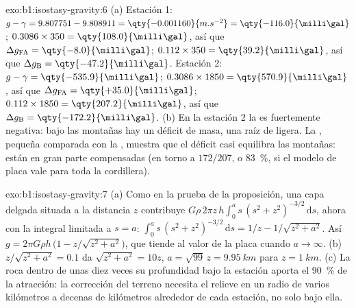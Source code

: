 \begin{solution}{exo:b1:isostasy-gravity:6}
(a) Estación 1: $g - \gamma = 9.807751 - 9.808911 = \qty{-0.001160}{m.s^{-2}} =
\qty{-116.0}{\milli\gal}$;  $0.3086\times350 =
\qty{108.0}{\milli\gal}$, así que $\Delta g_{\mathrm{FA}} = \qty{-8.0}{\milli\gal}$;
 $0.112\times350 = \qty{39.2}{\milli\gal}$, así que
$\Delta g_{\mathrm B} = \qty{-47.2}{\milli\gal}$.
Estación 2: $g - \gamma = \qty{-535.9}{\milli\gal}$; 
$0.3086\times1850 = \qty{570.9}{\milli\gal}$, así que $\Delta g_{\mathrm{FA}} =
\qty{+35.0}{\milli\gal}$;  $0.112\times1850 =
\qty{207.2}{\milli\gal}$, así que $\Delta g_{\mathrm B} = \qty{-172.2}{\milli\gal}$.
(b) En la estación 2 la  es fuertemente negativa: bajo las montañas
hay un déficit de masa, una raíz de  ligera. La , pequeña
comparada con la , muestra que el déficit casi equilibra las montañas:
están en gran parte compensadas (en torno a $172/207$, o \qty{83}{\percent}, si el modelo de
placa vale para toda la cordillera).
\end{solution}

\begin{solution}{exo:b1:isostasy-gravity:7}
(a) Como en la prueba de la proposición, una capa delgada situada a la distancia $z$
contribuye $G\rho\,2\pi z\,h\int_0^a s\,(s^2 + z^2)^{-3/2}\,\mathrm ds$, ahora
con la integral limitada a $s = a$:
$\int_0^a s\,(s^2 + z^2)^{-3/2}\,\mathrm ds = 1/z - 1/\sqrt{z^2 + a^2}$. Así
$g = 2\pi G\rho h\,\bigl(1 - z/\sqrt{z^2 + a^2}\bigr)$, que tiende al valor de la placa
cuando $a \to \infty$. (b) $z/\sqrt{z^2 + a^2} = 0.1$ da
$\sqrt{z^2 + a^2} = 10z$, $a = \sqrt{99}\,z = \qty{9.95}{km}$ para
$z = \qty{1}{km}$. (c) La roca dentro de unas diez veces su profundidad bajo la
estación aporta el \qty{90}{\percent} de la atracción: la corrección del terreno
necesita el relieve en un radio de varios kilómetros a decenas de kilómetros alrededor
de cada estación, no solo bajo ella.
\end{solution}

